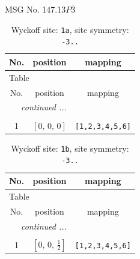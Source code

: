 \documentclass[fleqn,8pt]{jsarticle}
\begin{document}
\setcounter{MaxMatrixCols}{32}

\renewcommand{\tablename}{Table~}
\renewcommand{\figurename}{Figure~}
\begin{center}
\LARGE
MSG No. 147.13\quad$P\bar{3}$
\end{center}
\renewcommand{\arraystretch}{1.2}
\begin{longtable}{ccc}
\caption{Wyckoff site: {\tt 1a}, site symmetry: {\tt -3..}}
 \\
 \hline \hline
No. & position & mapping \\ \hline \endfirsthead

\multicolumn{2}{l}{\tablename\ \thetable{}} \\
 \hline \hline
No. & position & mapping \\ \hline \endhead

 \hline \hline
\multicolumn{2}{r}{\footnotesize\it continued ...} \\ \endfoot

 \hline \hline
\multicolumn{2}{r}{} \\ \endlastfoot

1 & $\left[ 0,\, 0,\, 0 \right]$ & {\tt [1,2,3,4,5,6]} \\
\end{longtable}
\renewcommand{\arraystretch}{1.2}
\begin{longtable}{ccc}
\caption{Wyckoff site: {\tt 1b}, site symmetry: {\tt -3..}}
 \\
 \hline \hline
No. & position & mapping \\ \hline \endfirsthead

\multicolumn{2}{l}{\tablename\ \thetable{}} \\
 \hline \hline
No. & position & mapping \\ \hline \endhead

 \hline \hline
\multicolumn{2}{r}{\footnotesize\it continued ...} \\ \endfoot

 \hline \hline
\multicolumn{2}{r}{} \\ \endlastfoot

1 & $\left[ 0,\, 0,\, \frac{1}{2} \right]$ & {\tt [1,2,3,4,5,6]} \\
\end{longtable}
\renewcommand{\arraystretch}{1.2}
\end{document}
